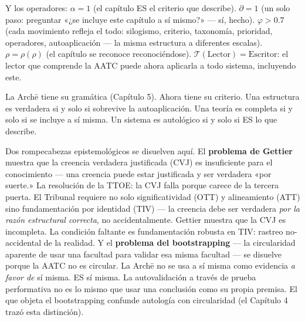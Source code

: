 \documentclass[10pt, openany, oneside]{book}
\begin{document}
Y los operadores: $\alpha = 1$ (el capítulo ES el criterio que describe). $\partial = 1$ (un solo paso: preguntar «¿se incluye este capítulo a sí mismo?» --- sí, hecho). $\varphi > 0.7$ (cada movimiento refleja el todo: silogismo, criterio, taxonomía, prioridad, operadores, autoaplicación --- la misma estructura a diferentes escalas). $\rho = \rho(\rho)$ (el capítulo se reconoce reconociéndose). $\mathcal{T}(\text{Lector}) = \text{Escritor}$: el lector que comprende la AATC puede ahora aplicarla a todo sistema, incluyendo este.

\vspace{2em}

La Arch\={e} tiene su gramática (Capítulo 5). Ahora tiene su criterio. Una estructura es verdadera si y solo si sobrevive la autoaplicación. Una teoría es completa si y solo si se incluye a sí misma. Un sistema es autológico si y solo si ES lo que describe.

Dos rompecabezas epistemológicos se disuelven aquí. El \textbf{problema de Gettier} muestra que la creencia verdadera justificada (CVJ) es insuficiente para el conocimiento --- una creencia puede estar justificada y ser verdadera «por suerte.» La resolución de la TTOE: la CVJ falla porque carece de la tercera puerta. El Tribunal requiere no solo significatividad (OTT) y alineamiento (ATT) sino fundamentación por identidad (TIV) --- la creencia debe ser verdadera \textit{por la razón estructural correcta}, no accidentalmente. Gettier muestra que la CVJ es incompleta. La condición faltante es fundamentación robusta en TIV: rastreo no-accidental de la realidad. Y el \textbf{problema del bootstrapping} --- la circularidad aparente de usar una facultad para validar esa misma facultad --- se disuelve porque la AATC no es circular. La Arch\={e} no se usa a sí misma como evidencia \textit{a favor de} sí misma. ES sí misma. La autovalidación a través de prueba performativa no es lo mismo que usar una conclusión como su propia premisa. El que objeta el bootstrapping confunde autología con circularidad (el Capítulo 4 trazó esta distinción).
\end{document}

